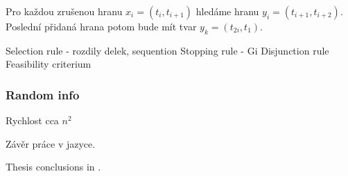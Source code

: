 \documentclass[
  biblatex,
  figures=false,
  glossaries,
  index
]{kidiplom}
\begin{document}
Pro každou zrušenou hranu $x_i = (t_i, t_{i+1})$ hledáme hranu $y_i = (t_{i+1}, t_{i+2})$. Poslední přidaná hrana potom bude mít tvar $y_k = (t_{2i}, t_1)$.




Selection rule - rozdily delek, sequention
Stopping rule - Gi
Disjunction rule
Feasibility criterium


\subsubsection{Random info}
Rychlost cca $n ^ 2$

\begin{kiconclusions}
Závěr práce v  jazyce.
\end{kiconclusions}

\begin{kiconclusions}[english]
Thesis conclusions in .
\end{kiconclusions}



\printglossary


\nocite{*}
\printbibliography

%
%

\printindex
\end{document}
